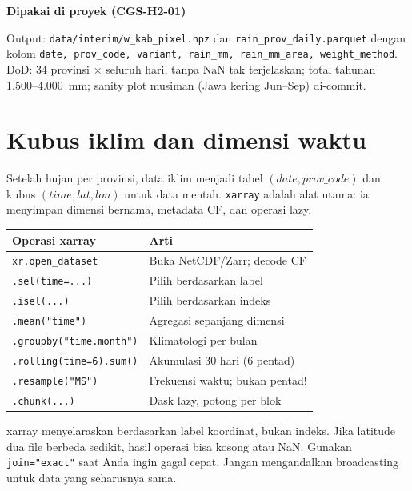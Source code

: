 \documentclass[9pt,a4paper]{extarticle}
\newcommand{\code}[1]{\texttt{\small\color{ink}#1}}
\newcommand{\thead}[1]{\textbf{\color{ink}#1}}
\newenvironment{projectbox}[1]
  {\begin{tcolorbox}[enhanced,breakable,colback=bg,colframe=bg,boxrule=0pt,arc=1.1mm,
    left=3mm,right=2.2mm,top=1.4mm,bottom=1.4mm,borderline west={2.2pt}{0pt}{ink},
    before skip=3pt,after skip=3pt]
   \textcolor{ink}{\sffamily\bfseries #1}\par\vspace{0.5pt}}
  {\end{tcolorbox}}
\begin{document}
\begin{projectbox}{Dipakai di proyek (CGS-H2-01)}
Output: \code{data/interim/w\_kab\_pixel.npz} dan \code{rain\_prov\_daily.parquet} dengan kolom \code{date, prov\_code, variant, rain\_mm, rain\_mm\_area, weight\_method}. DoD: 34 provinsi $\times$ seluruh hari, tanpa NaN tak terjelaskan; total tahunan 1.500--4.000~mm; sanity plot musiman (Jawa kering Jun--Sep) di-commit.
\end{projectbox}

\section{Kubus iklim dan dimensi waktu}

Setelah hujan per provinsi, data iklim menjadi tabel $(date, prov\_code)$ dan kubus $(time, lat, lon)$ untuk data mentah. \code{xarray} adalah alat utama: ia menyimpan dimensi bernama, metadata CF, dan operasi lazy.

\begin{center}
\footnotesize
\begin{tabularx}{\linewidth}{@{}>{\RaggedRight\arraybackslash}p{4.0cm}>{\RaggedRight\arraybackslash}X@{}}
\toprule
\rowcolor{bg}\thead{Operasi xarray} & \thead{Arti}\\
\midrule
\code{xr.open\_dataset} & Buka NetCDF/Zarr; decode CF\\
\code{.sel(time=...)} & Pilih berdasarkan label\\
\code{.isel(...)} & Pilih berdasarkan indeks\\
\code{.mean("time")} & Agregasi sepanjang dimensi\\
\code{.groupby("time.month")} & Klimatologi per bulan\\
\code{.rolling(time=6).sum()} & Akumulasi 30 hari (6 pentad)\\
\code{.resample("MS")} & Frekuensi waktu; bukan pentad!\\
\code{.chunk(...)} & Dask lazy, potong per blok\\
\bottomrule
\end{tabularx}
\end{center}

xarray menyelaraskan berdasarkan label koordinat, bukan indeks. Jika latitude dua file berbeda sedikit, hasil operasi bisa kosong atau NaN. Gunakan \code{join="exact"} saat Anda ingin gagal cepat. Jangan mengandalkan broadcasting untuk data yang seharusnya sama.
\end{document}
